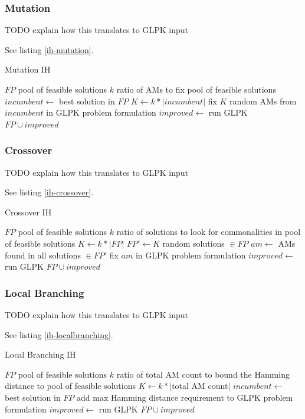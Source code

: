 \documentclass[a4paper,12pt,oneside]{report}
\begin{document}
\subsubsection{Mutation}

TODO explain how this translates to GLPK input

See listing \ref{ih-mutation}.

\begin{algorithm}
\caption{Mutation IH}
\label{ih-mutation}
\begin{algorithmic}
\REQUIRE $FP$ pool of feasible solutions
\REQUIRE $k$ ratio of AMs to fix
\ENSURE pool of feasible solutions
\STATE $incumbent \gets $ best solution in $FP$ 
\STATE $K \gets k * |incumbent|$
\STATE fix $K$ random AMs from $incumbent$ in GLPK problem formulation
\STATE $improved \gets $ run GLPK
\RETURN $FP \cup improved$
\end{algorithmic}
\end{algorithm}

\subsubsection{Crossover}

TODO explain how this translates to GLPK input

See listing \ref{ih-crossover}.

\begin{algorithm}
\caption{Crossover IH}
\label{ih-crossover}
\begin{algorithmic}
\REQUIRE $FP$ pool of feasible solutions
\REQUIRE $k$ ratio of solutions to look for commonalities in
\ENSURE pool of feasible solutions
\STATE $K \gets k * |FP|$
\STATE $FP' \gets K$ random solutions $\in FP$
\STATE $am \gets$ AMs found in all solutions $\in FP'$
\STATE fix $am$ in GLPK problem formulation
\STATE $improved \gets $ run GLPK
\RETURN $FP \cup improved$
\end{algorithmic}
\end{algorithm}

\subsubsection{Local Branching}

TODO explain how this translates to GLPK input

See listing \ref{ih-localbranching}.

\begin{algorithm}
\caption{Local Branching IH}
\label{ih-localbranching}
\begin{algorithmic}
\REQUIRE $FP$ pool of feasible solutions
\REQUIRE $k$ ratio of total AM count to bound the Hamming distance to
\ENSURE pool of feasible solutions
\STATE $K \gets k * |$total AM count$|$
\STATE $incumbent \gets $ best solution in $FP$ 
\STATE add max Hamming distance requirement to GLPK problem formulation
\STATE $improved \gets $ run GLPK
\RETURN $FP \cup improved$
\end{algorithmic}
\end{algorithm}
\end{document}
